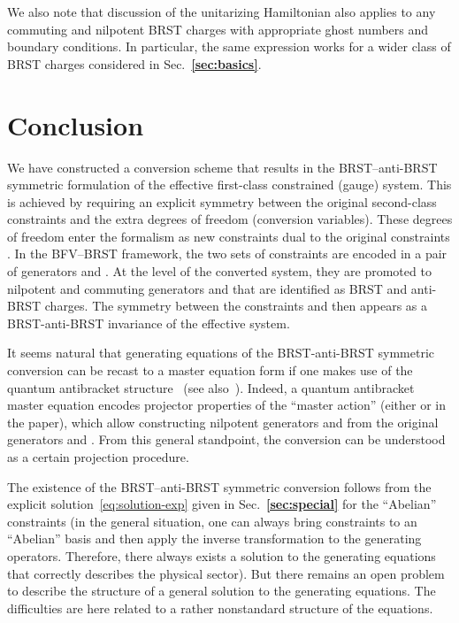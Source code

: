 \documentclass[a4paper,12pt]{amsart}
\providecommand{\myth}{\mathbf{\Theta}}
\numberwithin{equation}{section}
\providecommand{\bref}[1]{\textbf{\ref{#1}}}
\begin{document}
We also note that discussion of the unitarizing Hamiltonian also
applies to any commuting and nilpotent BRST charges \coordHE{} with
appropriate ghost numbers and boundary conditions. In particular, the
same expression works for a wider class of BRST charges considered in
Sec.~\bref{sec:basics}.




\section{Conclusion} 

We have constructed a conversion scheme that results in the
BRST--anti-BRST symmetric formulation of the effective first-class
constrained (gauge) system.  This is achieved by requiring an explicit
symmetry between the original second-class constraints \myHighlight{$\theta_\alpha$}\coordHE{}
and the extra degrees of freedom (conversion variables).  These
degrees of freedom enter the formalism as new constraints
\myHighlight{$\bar\theta^\alpha$}\coordHE{} dual to the original constraints \myHighlight{$\theta_\alpha$}\coordHE{}.
In the BFV--BRST framework, the two sets of constraints are encoded in
a pair of generators \myHighlight{$\myth$}\coordHE{} and \myHighlight{$\bar\myth$}\coordHE{}.  At the level of the
converted system, they are promoted to nilpotent and commuting
generators \myHighlight{$\Omega$}\coordHE{} and \myHighlight{$\bar\Omega$}\coordHE{} that are identified as BRST and
anti-BRST charges.  The symmetry between the constraints \myHighlight{$\theta$}\coordHE{} and
\myHighlight{$\bar\theta$}\coordHE{} then appears as a BRST-anti-BRST invariance of the
effective system.

It seems natural that generating equations of the BRST-anti-BRST
symmetric conversion can be recast to a master equation form if one
makes use of the quantum antibracket structure~\cite{BMQA} (see
also~\cite{BTQA}).  Indeed, a quantum antibracket master equation
encodes projector properties of the ``master action'' (either \coordHE{} or
\coordHE{} in the paper), which allow constructing nilpotent generators
\myHighlight{$\Omega$}\coordHE{} and \myHighlight{$\bar\Omega$}\coordHE{} from the original generators \myHighlight{$\myth$}\coordHE{} and
\myHighlight{$\bar\myth$}\coordHE{}.  {}From this general standpoint, the conversion can be
understood as a certain projection procedure.

The existence of the BRST--anti-BRST symmetric conversion follows from
the explicit solution~\eqref{eq:solution-exp} given in
Sec.~\bref{sec:special} for the ``Abelian'' constraints (in the
general situation, one can always bring constraints to an ``Abelian''
basis and then apply the inverse transformation to the generating
operators.  Therefore, there always exists a solution to the
generating equations that correctly describes the physical sector).
But there remains an open problem to describe the structure of a
general solution to the generating equations.  The difficulties are
here related to a rather nonstandard structure of the equations.
\end{document}
